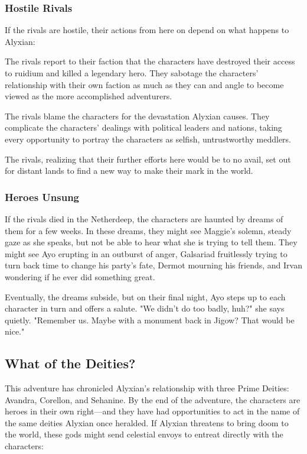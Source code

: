 \documentclass[10pt,a4paper,twoside,bg=print,twocolumn,openany,nodeprecatedcode]{dndbook}
\begin{document}
\subsubsection{Hostile Rivals}
If the rivals are hostile, their actions from here on depend on what happens to Alyxian:


\begin{description}[nolistsep]
\item[Alyxian Is Killed.]
The rivals report to their faction that the characters have destroyed their access to ruidium and killed a legendary hero. They sabotage the characters' relationship with their own faction as much as they can and angle to become viewed as the more accomplished adventurers.
\item[Alyxian Is Unleashed.]
The rivals blame the characters for the devastation Alyxian causes. They complicate the characters' dealings with political leaders and nations, taking every opportunity to portray the characters as selfish, untrustworthy meddlers.
\item[Alyxian Is Redeemed.]
The rivals, realizing that their further efforts here would be to no avail, set out for distant lands to find a new way to make their mark in the world.
\end{description}

\subsubsection{Heroes Unsung}
If the rivals died in the Netherdeep, the characters are haunted by dreams of them for a few weeks. In these dreams, they might see Maggie's solemn, steady gaze as she speaks, but not be able to hear what she is trying to tell them. They might see Ayo erupting in an outburst of anger, Galsariad fruitlessly trying to turn back time to change his party's fate, Dermot mourning his friends, and Irvan wondering if he ever did something great.

Eventually, the dreams subside, but on their final night, Ayo steps up to each character in turn and offers a salute. "We didn't do too badly, huh?" she says quietly. "Remember us. Maybe with a monument back in Jigow? That would be nice."


\newpage
\subsection{What of the Deities?}
This adventure has chronicled Alyxian's relationship with three Prime Deities: Avandra, Corellon, and Sehanine. By the end of the adventure, the characters are heroes in their own right—and they have had opportunities to act in the name of the same deities Alyxian once heralded. If Alyxian threatens to bring doom to the world, these gods might send celestial envoys to entreat directly with the characters:
\end{document}
